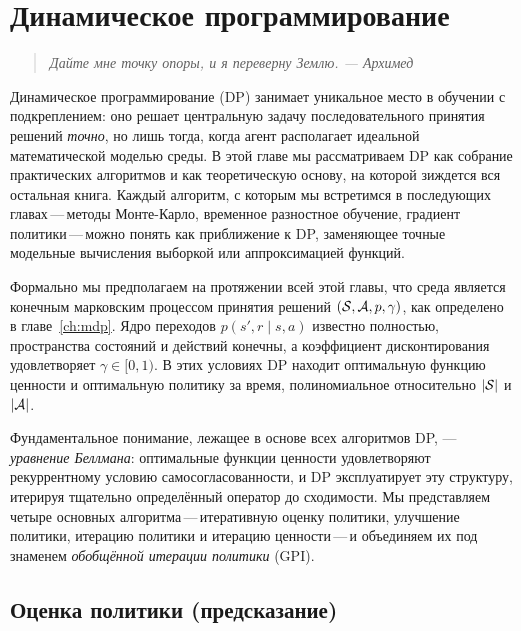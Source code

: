 \chapter{Динамическое программирование}
\label{ch:dp}

\begin{quote}
\itshape
Дайте мне точку опоры, и я переверну Землю.
\upshape --- Архимед
\end{quote}

\bigskip

Динамическое программирование (DP) занимает уникальное место в обучении с подкреплением: оно решает центральную задачу последовательного принятия решений \emph{точно}, но лишь тогда, когда агент располагает идеальной математической моделью среды.  В этой главе мы рассматриваем DP как собрание практических алгоритмов и как теоретическую основу, на которой зиждется вся остальная книга.  Каждый алгоритм, с которым мы встретимся в последующих главах\,---\,методы Монте-Карло, временное разностное обучение, градиент политики\,---\,можно понять как приближение к DP, заменяющее точные модельные вычисления выборкой или аппроксимацией функций.

Формально мы предполагаем на протяжении всей этой главы, что среда является конечным марковским процессом принятия решений $({\mathcal{S}}, {\mathcal{A}}, p, \gamma)$, как определено в главе~\ref{ch:mdp}.  Ядро переходов $p(s', r \mid s, a)$ известно полностью, пространства состояний и действий конечны, а коэффициент дисконтирования удовлетворяет $\gamma \in [0,1)$.  В этих условиях DP находит оптимальную функцию ценности и оптимальную политику за время, полиномиальное относительно $|\mathcal{S}|$ и $|\mathcal{A}|$.

Фундаментальное понимание, лежащее в основе всех алгоритмов DP, — \emph{уравнение Беллмана}: оптимальные функции ценности удовлетворяют рекуррентному условию самосогласованности, и DP эксплуатирует эту структуру, итерируя тщательно определённый оператор до сходимости.  Мы представляем четыре основных алгоритма\,---\,итеративную оценку политики, улучшение политики, итерацию политики и итерацию ценности\,---\,и объединяем их под знаменем \emph{обобщённой итерации политики} (GPI).

\section{Оценка политики (предсказание)}
\label{sec:policy-evaluation}

